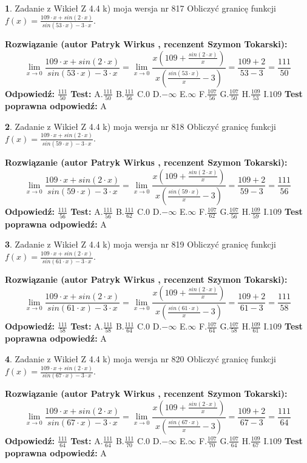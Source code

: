 \documentclass[12pt, a4paper]{article}
\theoremstyle{definition} %
\newtheorem{zad}{}
\newcommand{\zadStart}[1]{\begin{zad}#1\newline}
\newcommand{\zadStop}{\end{zad}}
\newcommand{\rozwStart}[2]{\noindent \textbf{Rozwiązanie (autor #1 , recenzent #2): }\newline}
\newcommand{\rozwStop}{\newline}
\newcommand{\odpStart}{\noindent \textbf{Odpowiedź:}\newline}
\newcommand{\odpStop}{\newline}
\newcommand{\testStart}{\noindent \textbf{Test:}\newline}
\newcommand{\testStop}{\newline}
\newcommand{\kluczStart}{\noindent \textbf{Test poprawna odpowiedź:}\newline}
\newcommand{\kluczStop}{\newline}
\begin{document}
\zadStart{Zadanie z Wikieł Z 4.4 k) moja wersja nr 817}
Obliczyć granicę funkcji $f(x)=\frac{109\cdot x +sin(2\cdot x)}{sin(53\cdot x) -3\cdot x}$.
\zadStop
\rozwStart{Patryk Wirkus}{Szymon Tokarski}
$$\lim\limits_{x\to 0}\frac{109\cdot x +sin(2\cdot x)}{sin(53\cdot x) -3\cdot x}
=\lim\limits_{x\to 0}\frac{x(109+\frac{sin(2\cdot x)}{x})}{x(\frac{sin(53\cdot x)}{x}-3)}
=\frac{109+2}{53-3} = \frac{111}{50}$$
\rozwStop
\odpStart
$\frac{111}{50}$
\odpStop
\testStart
A.$\frac{111}{50}$
B.$\frac{111}{56}$
C.$0$
D.$-\infty$
E.$\infty$
F.$\frac{107}{56}$
G.$\frac{107}{50}$
H.$\frac{109}{53}$
I.$109$
\testStop
\kluczStart
A
\kluczStop



\zadStart{Zadanie z Wikieł Z 4.4 k) moja wersja nr 818}
Obliczyć granicę funkcji $f(x)=\frac{109\cdot x +sin(2\cdot x)}{sin(59\cdot x) -3\cdot x}$.
\zadStop
\rozwStart{Patryk Wirkus}{Szymon Tokarski}
$$\lim\limits_{x\to 0}\frac{109\cdot x +sin(2\cdot x)}{sin(59\cdot x) -3\cdot x}
=\lim\limits_{x\to 0}\frac{x(109+\frac{sin(2\cdot x)}{x})}{x(\frac{sin(59\cdot x)}{x}-3)}
=\frac{109+2}{59-3} = \frac{111}{56}$$
\rozwStop
\odpStart
$\frac{111}{56}$
\odpStop
\testStart
A.$\frac{111}{56}$
B.$\frac{111}{62}$
C.$0$
D.$-\infty$
E.$\infty$
F.$\frac{107}{62}$
G.$\frac{107}{56}$
H.$\frac{109}{59}$
I.$109$
\testStop
\kluczStart
A
\kluczStop



\zadStart{Zadanie z Wikieł Z 4.4 k) moja wersja nr 819}
Obliczyć granicę funkcji $f(x)=\frac{109\cdot x +sin(2\cdot x)}{sin(61\cdot x) -3\cdot x}$.
\zadStop
\rozwStart{Patryk Wirkus}{Szymon Tokarski}
$$\lim\limits_{x\to 0}\frac{109\cdot x +sin(2\cdot x)}{sin(61\cdot x) -3\cdot x}
=\lim\limits_{x\to 0}\frac{x(109+\frac{sin(2\cdot x)}{x})}{x(\frac{sin(61\cdot x)}{x}-3)}
=\frac{109+2}{61-3} = \frac{111}{58}$$
\rozwStop
\odpStart
$\frac{111}{58}$
\odpStop
\testStart
A.$\frac{111}{58}$
B.$\frac{111}{64}$
C.$0$
D.$-\infty$
E.$\infty$
F.$\frac{107}{64}$
G.$\frac{107}{58}$
H.$\frac{109}{61}$
I.$109$
\testStop
\kluczStart
A
\kluczStop



\zadStart{Zadanie z Wikieł Z 4.4 k) moja wersja nr 820}
Obliczyć granicę funkcji $f(x)=\frac{109\cdot x +sin(2\cdot x)}{sin(67\cdot x) -3\cdot x}$.
\zadStop
\rozwStart{Patryk Wirkus}{Szymon Tokarski}
$$\lim\limits_{x\to 0}\frac{109\cdot x +sin(2\cdot x)}{sin(67\cdot x) -3\cdot x}
=\lim\limits_{x\to 0}\frac{x(109+\frac{sin(2\cdot x)}{x})}{x(\frac{sin(67\cdot x)}{x}-3)}
=\frac{109+2}{67-3} = \frac{111}{64}$$
\rozwStop
\odpStart
$\frac{111}{64}$
\odpStop
\testStart
A.$\frac{111}{64}$
B.$\frac{111}{70}$
C.$0$
D.$-\infty$
E.$\infty$
F.$\frac{107}{70}$
G.$\frac{107}{64}$
H.$\frac{109}{67}$
I.$109$
\testStop
\kluczStart
A
\kluczStop
\end{document}
